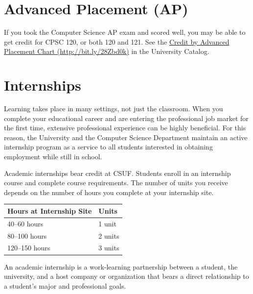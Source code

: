 \documentclass{book}
\newcommand{\CampusName}{CSUF}
\begin{document}
\section{Advanced Placement (AP)}
\label{section:ap}
If you took the Computer Science AP exam and scored well, you may be able to get credit for CPSC 120, or both 120 and 121. See the \href{http://catalog.fullerton.edu/content.php?catoid=2&navoid=153#Credit%20by%20Advanced%20Placement%20Chart}{Credit by Advanced Placement Chart (\url{http://bit.ly/28Zbd0k})} in the University Catalog.

\section{Internships}

Learning takes place in many settings, not just the classroom. When you complete your educational career and are entering the professional job market for the first time, extensive professional experience can be highly beneficial. For this reason, the University and the Computer Science Department maintain an active internship program as a service to all students interested in obtaining employment while still in school.

Academic internships bear credit at \CampusName. Students enroll in an internship course and complete course requirements. The number of units you receive depends on the number of hours you complete at your internship site.

\begin{center}
\begin{tabular}{|l|l|} \hline
  \textbf{Hours at Internship Site} & \textbf{Units} \\ \hline
  40--60 hours & 1 unit \\ \hline
  80--100 hours & 2 units \\ \hline
  120--150 hours & 3 units \\ \hline
\end{tabular}
\end{center}

An academic internship is a work-learning partnership between a student, the university, and a host company or organization that bears a direct relationship to a student’s major and professional goals.
\end{document}
